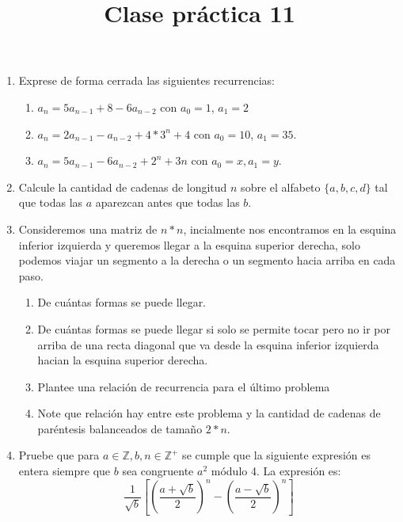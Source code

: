 \documentclass{article}
\title{Clase pr\'actica 11}
\begin{document}
\maketitle
\date{}
\begin{enumerate}
    \item Exprese de forma cerrada las siguientes recurrencias:
        \begin{enumerate}
            \item $a_n=5a_{n-1}+8-6a_{n-2}$ con $a_0 = 1$, $a_1=2$
            \item $a_n = 2a_{n-1} - a_{n-2} + 4*3^n + 4$ con $a_0=10$, $a_1 = 35$. 
            \item $a_n = 5a_{n-1} - 6a_{n-2} + 2^n + 3n$ con $a_0 = x, a_1 = y$.
        \end{enumerate}
    \item Calcule la cantidad de cadenas de longitud $n$ sobre el alfabeto $\{a,b,c,d\}$ tal que todas las $a$ aparezcan antes que todas las $b$.
    \item Consideremos una matriz de $n*n$, incialmente nos encontramos en la esquina inferior izquierda y queremos llegar a la esquina superior derecha, solo podemos viajar un segmento a la derecha o un segmento hacia arriba en cada paso.
        \begin{enumerate}
            \item De cu\'antas formas se puede llegar.
            \item De cu\'antas formas se puede llegar si solo se permite tocar pero no ir por arriba de una recta diagonal que va desde la esquina inferior izquierda hacian la esquina superior derecha. 
            \item Plantee una relaci\'on de recurrencia para el \'ultimo problema
            \item Note que relaci\'on hay entre este problema y la cantidad de cadenas de par\'entesis balanceados de tamaño $2*n$.
        \end{enumerate}
    \item Pruebe que para $a \in \mathbb{Z}, b, n \in \mathbb{Z^+}$ se cumple que la siguiente expresión es entera siempre que $b$ sea congruente $a^2$ módulo 4. La expresión es: $$\frac{1}{\sqrt{b}}[(\frac{a + \sqrt{b}}{2})^n - (\frac{a - \sqrt{b}}{2})^n]$$
\end{enumerate}
\end{document}
